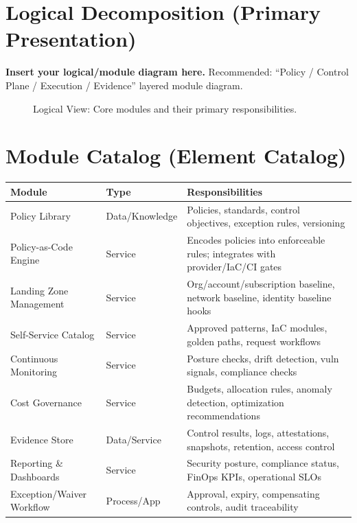 \documentclass[11pt]{report}
\begin{document}
\section{Logical Decomposition (Primary Presentation)}
\textbf{Insert your logical/module diagram here.} Recommended: “Policy / Control Plane / Execution / Evidence”
layered module diagram.

\begin{figure}[htbp]
  \centering
  \caption{Logical View: Core modules and their primary responsibilities.}
\end{figure}

\section{Module Catalog (Element Catalog)}
\begin{longtable}{@{}>{\raggedright\arraybackslash}p{} >{\raggedright\arraybackslash}p{} >{\raggedright\arraybackslash}p{}@{}}
\toprule
\textbf{Module} & \textbf{Type} & \textbf{Responsibilities} \\
\midrule
Policy Library & Data/Knowledge & Policies, standards, control objectives, exception rules, versioning \\
Policy-as-Code Engine & Service & Encodes policies into enforceable rules; integrates with provider/IaC/CI gates \\
Landing Zone Management & Service & Org/account/subscription baseline, network baseline, identity baseline hooks \\
Self-Service Catalog & Service & Approved patterns, IaC modules, golden paths, request workflows \\
Continuous Monitoring & Service & Posture checks, drift detection, vuln signals, compliance checks \\
Cost Governance & Service & Budgets, allocation rules, anomaly detection, optimization recommendations \\
Evidence Store & Data/Service & Control results, logs, attestations, snapshots, retention, access control \\
Reporting \& Dashboards & Service & Security posture, compliance status, FinOps KPIs, operational SLOs \\
Exception/Waiver Workflow & Process/App & Approval, expiry, compensating controls, audit traceability \\
\bottomrule
\end{longtable}
\end{document}
